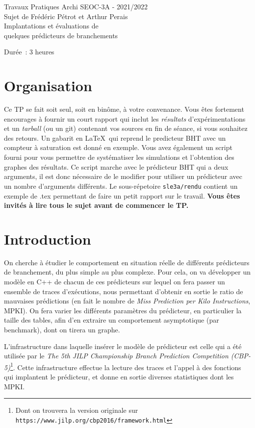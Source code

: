 \documentclass[a4paper]{article}
\begin{document}
\begin{center}
\large
Travaux Pratiques Archi SEOC-3A - 2021/2022\\
Sujet de Frédéric Pétrot et Arthur Perais\\
\LARGE
Implantations et évaluations de\\
quelques prédicteurs de branchements\\
\large

Durée~: 3 heures
\end{center}
\section{Organisation}
Ce TP se fait soit seul, soit en binôme, à votre convenance.
Vous êtes fortement encourages à fournir un court rapport qui inclut les \emph{résultats} d'expérimentations et un \emph{tarball} (ou un git) contenant vos sources en fin de séance, si vous souhaitez des retours.
Un gabarit en \LaTeX\ qui reprend le predicteur BHT avec un compteur à saturation est donné en exemple.
Vous avez également un script fourni pour vous permettre de systématiser les simulations et l'obtention des graphes des résultats.
Ce script marche avec le prédicteur BHT qui a deux arguments, il est donc nécessaire de le modifier pour utiliser un prédicteur avec un nombre d'arguments différents.
Le sous-répetoire \verb+sle3a/rendu+ contient un exemple de .tex permettant de faire un petit rapport sur le travail. \textbf{Vous êtes invités à lire tous le sujet avant de commencer le TP.}

\section{Introduction}
On cherche à étudier le comportement en situation réelle de différents prédicteurs de branchement, du plus simple au plus complexe. Pour cela, on va développer un modèle en C++ de chacun de ces prédicteurs sur lequel on fera passer un ensemble de traces d'exécutions, nous permettant d'obtenir en sortie le ratio de mauvaises prédictions (en fait le nombre de \emph{Miss Prediction per Kilo Instructions}, MPKI). On fera varier les différents paramètres du prédicteur, en particulier la taille des tables, afin d'en extraire un comportement asymptotique (par benchmark), dont on tirera un graphe.

L'infrastructure dans laquelle insérer le modèle de prédicteur est celle qui a été utilisée par le \emph{The 5th JILP Championship Branch Prediction Competition (CBP-5)}\footnote{Dont on trouvera la version originale sur \texttt{https://www.jilp.org/cbp2016/framework.html}}.
Cette infrastructure effectue la lecture des traces et l'appel à des fonctions qui implantent le prédicteur, et donne en sortie diverses statistiques dont les MPKI.
\end{document}
